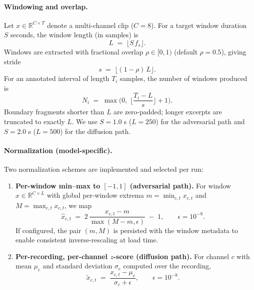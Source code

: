 \documentclass{article}
\begin{document}
\paragraph{Windowing and overlap.}
Let \(x \in \mathbb{R}^{C \times T}\) denote a multi-channel clip (\(C{=}8\)). For a target window duration \(S\) seconds, the window length (in samples) is
\begin{equation}
L \;=\; \big\lfloor S \, f_s \big\rfloor .
\end{equation}
Windows are extracted with fractional overlap \(\rho \in [0,1)\) (default \(\rho{=}0.5\)), giving stride
\begin{equation}
s \;=\; \big\lfloor (1-\rho)\,L \big\rfloor .
\end{equation}
For an annotated interval of length \(T_i\) samples, the number of windows produced is
\begin{equation}
N_i \;=\; \max\!\Big(0,\; \Big\lfloor \frac{T_i - L}{s} \Big\rfloor + 1 \Big).
\end{equation}
Boundary fragments shorter than \(L\) are zero-padded; longer excerpts are truncated to exactly \(L\).
We use \(S{=}1.0\) s (\(L{=}250\)) for the adversarial path and \(S{=}2.0\) s (\(L{=}500\)) for the diffusion path.

\paragraph{Normalization (model-specific).}
Two normalization schemes are implemented and selected per run:
\begin{enumerate}
\item \textbf{Per-window min--max to \([-1,1]\) (adversarial path).} For window \(x \in \mathbb{R}^{C\times L}\) with global per-window extrema \(m=\min_{c,t} x_{c,t}\) and \(M=\max_{c,t} x_{c,t}\), we map
\begin{equation}
\hat{x}_{c,t} \;=\; 2\,\frac{x_{c,t}-m}{\max(M-m,\epsilon)} \;-\; 1, \qquad \epsilon = 10^{-8}.
\end{equation}
If configured, the pair \((m,M)\) is persisted with the window metadata to enable consistent inverse-rescaling at load time.
\item \textbf{Per-recording, per-channel \(z\)-score (diffusion path).} For channel \(c\) with mean \(\mu_c\) and standard deviation \(\sigma_c\) computed over the recording,
\begin{equation}
\tilde{x}_{c,t} \;=\; \frac{x_{c,t}-\mu_c}{\sigma_c + \epsilon}, \qquad \epsilon = 10^{-8}.
\end{equation}
\end{enumerate}
\end{document}
